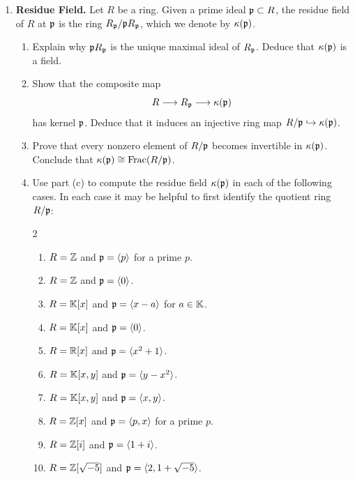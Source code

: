 \documentclass[12pt,reqno]{amsart}
\begin{document}
\begin{enumerate}[leftmargin=*, resume=problems]

\item \textbf{Residue Field.} Let $R$ be a ring. Given a prime ideal $\mathfrak{p} \subset R$, the residue field of $R$ at $\mathfrak{p}$ is the ring $R_{\mathfrak{p}}/\mathfrak{p} R_{\mathfrak{p}}$, which we denote by $\kappa(\mathfrak{p})$. 
\begin{enumerate}
	\item Explain why $\mathfrak{p} R_{\mathfrak{p}}$ is the unique maximal ideal of $R_{\mathfrak{p}}$. Deduce that $\kappa(\mathfrak{p})$ is a field.
	
	\item Show that the composite map
	\[
	R\longrightarrow R_{\mathfrak{p}}\longrightarrow \kappa(\mathfrak{p})
	\]
	has kernel $\mathfrak{p}$. Deduce that it induces an injective ring map $R/\mathfrak{p} \hookrightarrow \kappa(\mathfrak{p})$.

	\item Prove that every nonzero element of $R/\mathfrak{p}$ becomes invertible in $\kappa(\mathfrak{p})$. Conclude that $\kappa(\mathfrak{p})\cong \operatorname{Frac}(R/\mathfrak{p})$.

	\item Use part (c) to compute the residue field $\kappa(\mathfrak{p})$ in each of the following cases. In each case it may be helpful to first identify the quotient ring $R/\mathfrak{p}$:
	\begin{multicols}{2}
	\begin{enumerate}
		\item $R=\mathbb{Z}$ and $\mathfrak{p}=\langle p\rangle$ for a prime $p$.
		\item $R=\mathbb{Z}$ and $\mathfrak{p}=\langle 0\rangle$.
		\item $R=\mathbb{K}[x]$ and $\mathfrak{p}=\langle x-a\rangle$ for $a\in \mathbb{K}$.
		\item $R=\mathbb{K}[x]$ and $\mathfrak{p}=\langle 0\rangle$.
		\item $R=\mathbb{R}[x]$ and $\mathfrak{p}=\langle x^2+1\rangle$.
		\item $R=\mathbb{K}[x,y]$ and $\mathfrak{p}=\langle y-x^2\rangle$.
		\item $R=\mathbb{K}[x,y]$ and $\mathfrak{p}=\langle x,y\rangle$.
		\item $R=\mathbb{Z}[x]$ and $\mathfrak{p}=\langle p,x\rangle$ for a prime $p$.
		\item $R=\mathbb{Z}[i]$ and $\mathfrak{p}=\langle 1+i\rangle$.
		\item $R=\mathbb{Z}[\sqrt{-5}]$ and $\mathfrak{p}=\langle 2,1+\sqrt{-5}\rangle$.
	\end{enumerate}
	\end{multicols}
\end{enumerate}


\end{enumerate}
\end{document}
